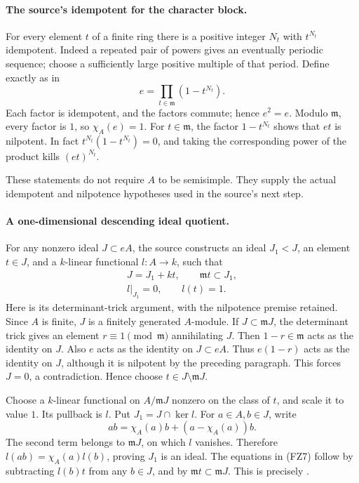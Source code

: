 \paragraph{The source's idempotent for the character block.}
For every element \(t\) of a finite ring there is a
positive integer \(N_t\) with \(t^{N_t}\) idempotent.
Indeed a repeated pair of powers gives an eventually
periodic sequence; choose a sufficiently large positive
multiple of that period.
Define exactly as in 
\[
                          e=\prod_{t\in\mathfrak m}(1-t^{N_t}).
 \tag{FZ6}\label{eq:faithful-character-idempotent}
\]
Each factor is idempotent, and the factors commute;
hence \(e^2=e\).
Modulo \(\mathfrak m\), every factor is \(1\), so
\(\chi_A(e)=1\).
For \(t\in\mathfrak m\), the factor \(1-t^{N_t}\)
shows that \(e t\) is nilpotent.
In fact
\(t^{N_t}(1-t^{N_t})=0\), and taking the corresponding
power of the product kills \((e t)^{N_t}\).

These statements do not require \(A\) to be semisimple.
They supply the actual idempotent and nilpotence
hypotheses used in the source's next step.

\paragraph{A one-dimensional descending ideal quotient.}
For any nonzero ideal \(J\subset eA\), the source
constructs an ideal \(J_1<J\), an element \(t\in J\),
and a \(k\)-linear functional \(l:A\to k\), such that
\[
 \begin{gathered}
       J=J_1+kt,\qquad \mathfrak m t\subset J_1,\\
                         l|_{J_1}=0,\qquad l(t)=1.
 \end{gathered}
 \tag{FZ7}\label{eq:faithful-ideal-colength-one}
\]
Here is its determinant-trick argument, with the
nilpotence premise retained.
Since \(A\) is finite, \(J\) is a finitely generated
\(A\)-module.
If \(J\subset\mathfrak mJ\), the determinant trick gives
an element \(r\equiv1\pmod{\mathfrak m}\) annihilating \(J\).
Then \(1-r\in\mathfrak m\) acts as the identity on \(J\).
Also \(e\) acts as the identity on \(J\subset eA\).
Thus \(e(1-r)\) acts as the identity on \(J\), although
it is nilpotent by the preceding paragraph.
This forces \(J=0\), a contradiction.
Hence choose \(t\in J\setminus\mathfrak mJ\).

Choose a \(k\)-linear functional on \(A/\mathfrak mJ\)
nonzero on the class of \(t\), and scale it to value \(1\).
Its pullback is \(l\).
Put \(J_1=J\cap\ker l\).
For \(a\in A,b\in J\), write
\[
                  ab=\chi_A(a)b+(a-\chi_A(a))b.
\]
The second term belongs to \(\mathfrak mJ\), on which
\(l\) vanishes.
Therefore \(l(ab)=\chi_A(a)l(b)\), proving \(J_1\)
is an ideal.
The equations in (FZ7) follow by subtracting \(l(b)t\)
from any \(b\in J\), and by
\(\mathfrak m t\subset\mathfrak mJ\).
This is precisely
.

